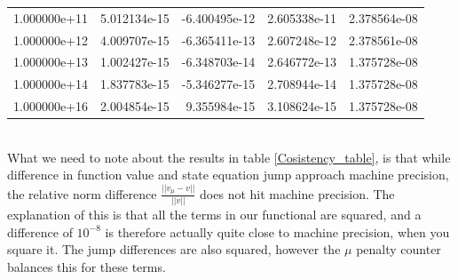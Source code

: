 \begin{table}[h]
\begin{tabular}{lrrrr}
1.000000e+11 &      5.012134e-15 &            -6.400495e-12 &  2.605338e-11 &  2.378564e-08 \\
1.000000e+12 &      4.009707e-15 &            -6.365411e-13 &  2.607248e-12 &  2.378561e-08 \\
1.000000e+13 &      1.002427e-15 &            -6.348703e-14 &  2.646772e-13 &  1.375728e-08 \\
1.000000e+14 &      1.837783e-15 &            -5.346277e-15 &  2.708944e-14 &  1.375728e-08 \\
1.000000e+16 &      2.004854e-15 &             9.355984e-15 &  3.108624e-15 &  1.375728e-08 \\
\bottomrule
\end{tabular}
\end{table}
\\
What we need to note about the results in table \ref{Cosistency_table}, is that while difference in function value and state equation jump approach machine precision, the relative norm difference $\frac{||v_{\mu}-v||}{||v||}$ does not hit machine precision. The explanation of this is that all the terms in our functional are squared, and a difference of $10^{-8}$ is therefore actually quite close to machine precision, when you square it. The jump differences are also squared, however the $\mu$ penalty counter balances this for these terms.

